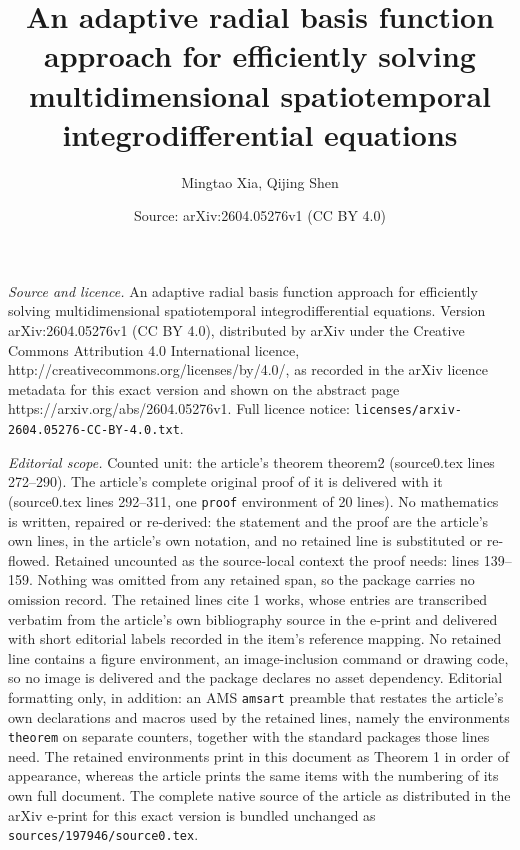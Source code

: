 \documentclass[10pt,a4paper]{amsart}
\title{An adaptive radial basis function approach for efficiently solving multidimensional spatiotemporal integrodifferential equations}
\author{Mingtao Xia, Qijing Shen}
\date{Source: arXiv:2604.05276v1 (CC BY 4.0)}
\begin{document}
\maketitle

\noindent\emph{Source and licence.} An adaptive radial basis function approach for efficiently solving multidimensional spatiotemporal integrodifferential equations. Version arXiv:2604.05276v1 (CC BY 4.0), distributed by arXiv under the Creative Commons Attribution 4.0 International licence, http://creativecommons.org/licenses/by/4.0/, as recorded in the arXiv licence metadata for this exact version and shown on the abstract page https://arxiv.org/abs/2604.05276v1. Full licence notice: \texttt{licenses/arxiv-2604.05276-CC-BY-4.0.txt}.\par\smallskip

\noindent\textit{Editorial scope.} Counted unit: the article's theorem theorem2 (source0.tex lines 272--290). The article's complete original proof of it is delivered with it (source0.tex lines 292--311, one \texttt{proof} environment of 20 lines). No mathematics is written, repaired or re-derived: the statement and the proof are the article's own lines, in the article's own notation, and no retained line is substituted or re-flowed.  Retained uncounted as the source-local context the proof needs: lines 139--159.  Nothing was omitted from any retained span, so the package carries no omission record.  The retained lines cite 1 works, whose entries are transcribed verbatim from the article's own bibliography source in the e-print and delivered with short editorial labels recorded in the item's reference mapping.  No retained line contains a figure environment, an image-inclusion command or drawing code, so no image is delivered and the package declares no asset dependency.  Editorial formatting only, in addition: an AMS \texttt{amsart} preamble that restates the article's own declarations and macros used by the retained lines, namely the environments \texttt{theorem} on separate counters, together with the standard packages those lines need.  The retained environments print in this document as Theorem 1 in order of appearance, whereas the article prints the same items with the numbering of its own full document.  The complete native source of the article as distributed in the arXiv e-print for this exact version is bundled unchanged as \texttt{sources/197946/source0.tex}.
\end{document}
